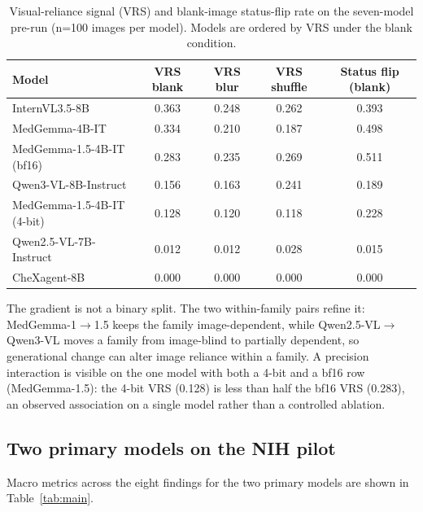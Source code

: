 \begin{table}[t]
\centering
\small
\begin{tabular}{lcccc}
\hline
Model & VRS blank & VRS blur & VRS shuffle & Status flip (blank) \\
\hline
InternVL3.5-8B & 0.363 & 0.248 & 0.262 & 0.393 \\
MedGemma-4B-IT & 0.334 & 0.210 & 0.187 & 0.498 \\
MedGemma-1.5-4B-IT (bf16) & 0.283 & 0.235 & 0.269 & 0.511 \\
Qwen3-VL-8B-Instruct & 0.156 & 0.163 & 0.241 & 0.189 \\
MedGemma-1.5-4B-IT (4-bit) & 0.128 & 0.120 & 0.118 & 0.228 \\
Qwen2.5-VL-7B-Instruct & 0.012 & 0.012 & 0.028 & 0.015 \\
CheXagent-8B & 0.000 & 0.000 & 0.000 & 0.000 \\
\hline
\end{tabular}
\caption{Visual-reliance signal (VRS) and blank-image status-flip rate on the
seven-model pre-run (n=100 images per model). Models are ordered by VRS under the
blank condition.}
\label{tab:reliance-spectrum}
\end{table}

The gradient is not a binary split. The two within-family pairs refine it:
MedGemma-1$\rightarrow$1.5 keeps the family image-dependent, while
Qwen2.5-VL$\rightarrow$Qwen3-VL moves a family from image-blind to partially
dependent, so generational change can alter image reliance within a family. A
precision interaction is visible on the one model with both a 4-bit and a bf16
row (MedGemma-1.5): the 4-bit VRS (0.128) is less than half the bf16 VRS
(0.283), an observed association on a single model rather than a controlled
ablation.

\subsection{Two primary models on the NIH pilot}

Macro metrics across the eight findings for the two primary models are shown in
Table~\ref{tab:main}.

